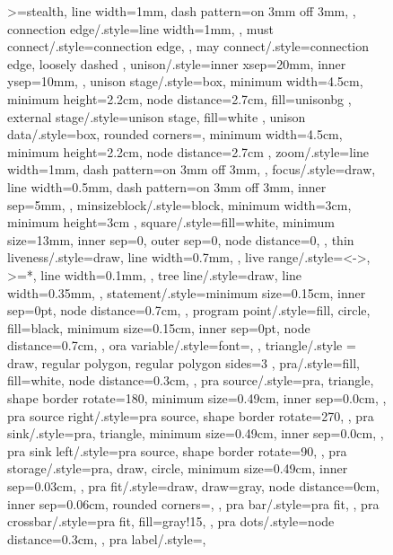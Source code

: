 \documentclass[acmsmall,authorversion,nonacm]{acmart}
\begin{document}
\begin{figure}
{{{{    >=stealth,
    line width=1mm,
    dash pattern=on 3mm off 3mm,
  },
  connection edge/.style={line width=1mm,
  },
  must connect/.style={connection edge,
  },
  may connect/.style={connection edge,
    loosely dashed
  },
  unison/.style={inner xsep=20mm,
    inner ysep=10mm,
  },
  unison stage/.style={box,
    minimum width=4.5cm,
    minimum height=2.2cm,
    node distance=2.7cm,
    fill=unisonbg
  },
  external stage/.style={unison stage,
    fill=white
  },
  unison data/.style={box,
    rounded corners=\cornerRadius,
    minimum width=4.5cm,
    minimum height=2.2cm,
    node distance=2.7cm
  },
  zoom/.style={line width=1mm,
    dash pattern=on 3mm off 3mm,
  },
  focus/.style={draw,
    line width=0.5mm,
    dash pattern=on 3mm off 3mm,
    inner sep=5mm,
  },
  minsizeblock/.style={block,
    minimum width=3cm,
    minimum height=3cm
  },
  square/.style={fill=white,
    minimum size=13mm,
    inner sep=0,
    outer sep=0,
    node distance=0,
  },
  thin liveness/.style={draw,
    line width=0.7mm,
  },
  live range/.style={<->,
      >=*,
      line width=0.1mm,
    },
  tree line/.style={draw,
    line width=0.35mm,
  },
  statement/.style={minimum size=0.15cm,
    inner sep=0pt,
    node distance=0.7cm,
  },
  program point/.style={fill,
    circle,
    fill=black,
    minimum size=0.15cm,
    inner sep=0pt,
    node distance=0.7cm,
  },
  ora variable/.style={font=\small,
  },
  triangle/.style = {draw, regular polygon, regular polygon sides=3 },
  pra/.style={fill,
    fill=white,
    node distance=0.3cm,
  },
  pra source/.style={pra,
    triangle,
    shape border rotate=180,
    minimum size=0.49cm,
    inner sep=0.0cm,
  },
  pra source right/.style={pra source,
    shape border rotate=270,
  },
  pra sink/.style={pra,
    triangle,
    minimum size=0.49cm,
    inner sep=0.0cm,
  },
  pra sink left/.style={pra source,
    shape border rotate=90,
  },
  pra storage/.style={pra,
    draw,
    circle,
    minimum size=0.49cm,
    inner sep=0.03cm,
  },
  pra fit/.style={draw,
    draw=gray,
    node distance=0cm,
    inner sep=0.06cm,
    rounded corners=\cornerRadius,
  },
  pra bar/.style={pra fit,
  },
  pra crossbar/.style={pra fit,
    fill=gray!15,
  },
  pra dots/.style={node distance=0.3cm,
  },
  pra label/.style={},
} }}
\end{figure}
\end{document}
